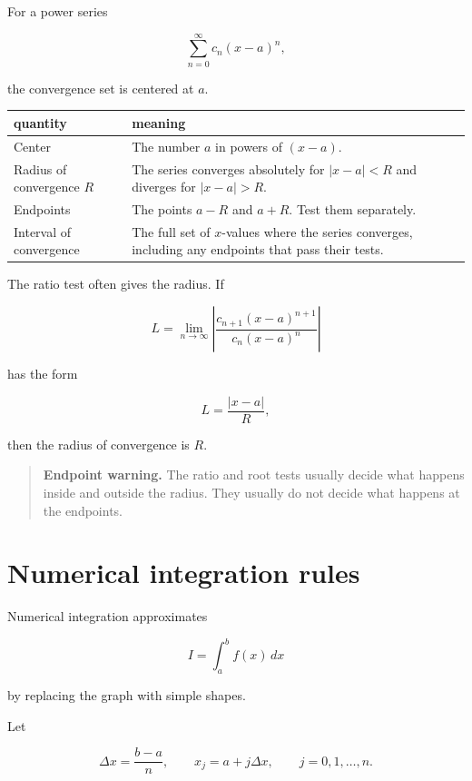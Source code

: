 For a power series

\[
\sum_{n=0}^{\infty} c_n(x-a)^n,
\]

the convergence set is centered at \(a\).

\begin{center}
\renewcommand{\arraystretch}{1.7}
\begin{tabular}{p{}|p{}}
\textbf{quantity} & \textbf{meaning} \\ \hline

Center &
The number \(a\) in powers of \((x-a)\). \\

Radius of convergence \(R\) &
The series converges absolutely for \(|x-a|<R\) and diverges for \(|x-a|>R\). \\

Endpoints &
The points \(a-R\) and \(a+R\).  Test them separately. \\

Interval of convergence &
The full set of \(x\)-values where the series converges, including any endpoints that
pass their tests.
\end{tabular}
\end{center}

The ratio test often gives the radius.  If

\[
L=\lim_{n\to\infty}
\left|
\frac{c_{n+1}(x-a)^{n+1}}{c_n(x-a)^n}
\right|
\]

has the form

\[
L=\frac{|x-a|}{R},
\]

then the radius of convergence is \(R\).

\begin{quote}
\textbf{Endpoint warning.}
The ratio and root tests usually decide what happens inside and outside the radius.
They usually do not decide what happens at the endpoints.
\end{quote}

\section{Numerical integration rules}
\label{appsec:numerical-integration-rules}

Numerical integration approximates

\[
I=\int_a^b f(x)\,dx
\]

by replacing the graph with simple shapes.

Let

\[
\Delta x=\frac{b-a}{n},
\qquad
x_j=a+j\Delta x,
\qquad
j=0,1,\ldots,n.
\]

